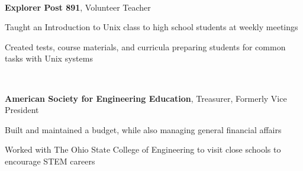 \documentclass[letterpaper]{resume}
\begin{document}
~

\textbf{Explorer Post 891}, Volunteer Teacher
\begin{compactitem}
\item Taught an Introduction to Unix class to high school students at
	weekly meetings
\item Created tests, course materials, and curricula preparing students
	for common tasks with Unix systems
\end{compactitem}

~

\textbf{American Society for Engineering Education}, Treasurer, Formerly Vice President%
\begin{compactitem}
\item Built and maintained a budget, while also managing general financial affairs
\item Worked with The Ohio State College of Engineering to visit close schools to encourage STEM careers
\end{compactitem}
\end{document}
